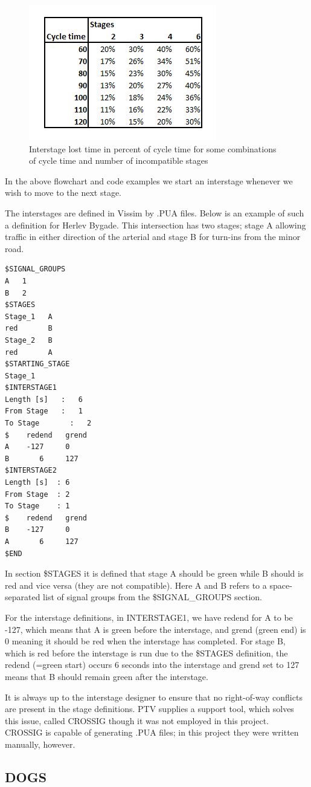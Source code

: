 \begin{figure}[!ht]
\begin{center}
\includegraphics[scale=0.6]{interstage_lost_time.png} 
\end{center}
\caption{Interstage lost time in percent of cycle time for some combinations of cycle time and number of incompatible stages}
\label{fig:lost_time_example}
\end{figure}

In the above flowchart and code examples we start an interstage whenever we wish to move to the next stage.

The interstages are defined in Vissim by .PUA files. Below is an example of such a definition for Herlev Bygade. This intersection has two stages; stage A allowing traffic in either direction of the arterial and stage B for turn-ins from the minor road. 

\begin{verbatim}
$SIGNAL_GROUPS
A   1
B   2
$STAGES
Stage_1   A
red       B
Stage_2   B
red       A
$STARTING_STAGE
Stage_1
$INTERSTAGE1
Length [s]	 :   6
From Stage	 :   1
To Stage	   :   2
$    redend   grend
A    -127     0
B       6     127
$INTERSTAGE2
Length [s]	: 6
From Stage	: 2
To Stage	: 1
$    redend   grend
B    -127     0
A       6     127
$END
\end{verbatim}

In section \$STAGES it is defined that stage A should be green while B should is red and vice versa (they are not compatible). Here A and B refers to a space-separated list of signal groups from the \$SIGNAL\_GROUPS section.

For the interstage definitions, in INTERSTAGE1, we have redend for A to be -127, which means that A is green before the interstage, and grend (green end) is 0 meaning it should be red when the interstage has completed. For stage B, which is red before the interstage is run due to the \$STAGES definition, the redend (=green start) occurs 6 seconds into the interstage and grend set to 127 means that B should remain green after the interstage.

It is always up to the interstage designer to ensure that no right-of-way conflicts are present in the stage definitions. PTV supplies a support tool, which solves this issue, called CROSSIG though it was not employed in this project. CROSSIG is capable of generating .PUA files; in this project they were written manually, however.

\subsection{DOGS}
